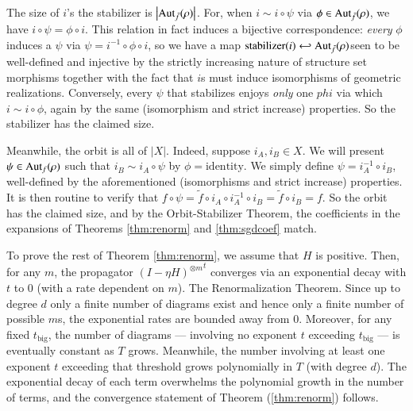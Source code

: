 \documentclass{article}
\newcommand{\Aut}{\text{\textnormal{Aut}}}
\newcommand{\wabs}[1]{\left|#1\right|}
\begin{document}
            The size of $i$'s the stabilizer is $\wabs{\Aut_{\tilde f}(\rho)}$.
            For, when $i \sim i \circ \psi$ via $\phi \in \Aut_{\tilde
            f}(\rho)$, we have $i\circ \psi = \phi \circ i$.  This relation in
            fact induces a bijective correspondence: \emph{every} $\phi$
            induces a $\psi$ via $\psi = i^{-1} \circ \phi \circ i$, so we have
            a map $\text{stabilizer}(i) \hookleftarrow \Aut_{\tilde f}(\rho)
            $seen to be well-defined and injective by the strictly increasing
            nature of structure set morphisms together with the fact that $i$s
            must induce isomorphisms of geometric realizations.  Conversely,
            every $\psi$ that stabilizes enjoys \emph{only} one $phi$ via which
            $i \sim i \circ \phi$, again by the same (isomorphism and strict
            increase) properties.  So the stabilizer has the claimed size.

            Meanwhile, the orbit is all of $\wabs{X}$.  Indeed, suppose
            $i_A, i_B \in X$.  We will present $\psi \in \Aut_f(\rho)$ such
            that $i_B \sim i_A \circ \psi$ by $\phi=\text{identity}$.  We
            simply define $\psi = i_A^{-1} \circ i_B$, well-defined by the
            aforementioned (isomorphisms and strict increase) properties.
            It is then routine to verify that
            $
                f \circ \psi
                =
                \tilde f \circ i_A \circ i_A^{-1} \circ i_B
                =
                \tilde f \circ i_B
                = f.
            $
            So the orbit has the claimed size, and by the Orbit-Stabilizer
            Theorem, the coefficients in the expansions of Theorems 
            \ref{thm:renorm} and \ref{thm:sgdcoef} match.

            To prove the rest of Theorem \ref{thm:renorm}, we assume that $H$
            is positive.  Then, for any $m$, the propagator ${(I-\eta
            H)^{\otimes m}}^t$ converges via an exponential decay with $t$ to
            $0$ (with a rate dependent on $m$).  The Renormalization Theorem.
            Since up to degree $d$ only a finite number of diagrams exist and
            hence only a finite number of possible $m$s, the exponential rates
            are bounded away from $0$.  Moreover, for any fixed
            $t_{\text{big}}$, the number of diagrams --- involving no exponent
            $t$ exceeding  $t_{\text{big}}$ --- is eventually constant as $T$
            grows.  Meanwhile, the number involving at least one exponent $t$
            exceeding that threshold grows polynomially in $T$ (with degree
            $d$).  The exponential decay of each term overwhelms the polynomial
            growth in the number of terms, and the convergence statement of
            Theorem (\ref{thm:renorm}) follows.
\end{document}
